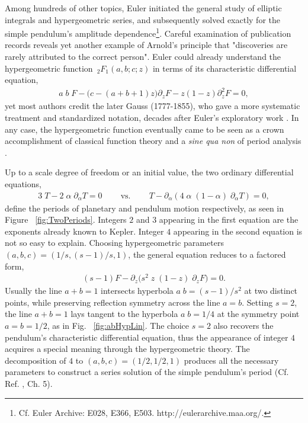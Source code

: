 \documentclass[nofootinbib,preprint]{revtex4-1}
\begin{document}
Among hundreds of other topics, Euler initiated the general study of elliptic integrals and 
hypergeometric series, and subsequently solved exactly for the simple pendulum's amplitude 
dependence\footnote{Cf. Euler Archive: E028, E366, E503. http://eulerarchive.maa.org/.}. Careful 
examination of publication records reveals yet another example of Arnold's principle that 
"discoveries are rarely attributed to the correct person". Euler could already understand 
the hypergeometric function $\,_2 F_1(a,b;c;z)$ in terms of its characteristic differential 
equation, 
\begin{eqnarray}
a \;b\; F - \big(c-(a+b+1)z\big) \partial_{z}F - z(1-z)\partial_{z}^2 F = 0,  \nonumber
\end{eqnarray}
yet most authors credit the later Gauss (1777-1855), who gave a more systematic treatment 
and standardized notation, decades after Euler's exploratory work \cite{DUTKA84}. In any case, 
the hypergeometric function eventually came to be seen as a crown accomplishment of classical 
function theory and a \textit{sine qua non} of period analysis \cite{KZ2001}. 

Up to a scale degree of freedom or an initial value, the two ordinary 
differential equations,
\begin{eqnarray}
3\;T-2\;\alpha \;\partial_{\alpha}T=0 \;\;\;\;\;\;\;\; \text{vs.} \nonumber
 \;\;\;\;\;\;\;\; T-\partial_{\alpha}(4\;\alpha\;(1-\alpha)\;\partial_{\alpha}T)=0,
\end{eqnarray}
define the periods of planetary and pendulum motion respectively, as seen in Figure ~\ref{fig:TwoPeriods}.  
Integers $2$ and $3$ appearing in the first equation are the exponents already known to Kepler. 
Integer $4$ appearing in the second equation is not so easy to explain. Choosing hypergeometric parameters 
$(a,b,c)=(1/s,(s-1)/s,1)$, the general equation reduces to a factored form,
\begin{eqnarray}
(s-1)F-\partial_{z}\big(s^{2}\;z\;(1-z)\;\partial_{z}F\big)=0. \nonumber
\end{eqnarray}
Usually the line $a+b=1$ intersects hyperbola $a\;b=(s-1)/s^2$ at two distinct points, 
while preserving reflection symmetry across the line $a=b$. Setting $s=2$, the line $a+b=1$ 
lays tangent to the hyperbola $a\;b=1/4$ at the symmetry point $a=b=1/2$, as in Fig.
~\ref{fig:abHypLin}. The choice $s=2$ also recovers the pendulum's characteristic 
differential equation, thus the appearance of integer $4$ acquires a special meaning 
through the hypergeometric theory. The decomposition of $4$ to $(a,b,c)=(1/2,1/2,1)$ 
produces all the necessary parameters to construct a series solution of the simple 
pendulum's period (Cf. Ref. \cite{GRAHAM1994}, Ch. 5).
\end{document}
